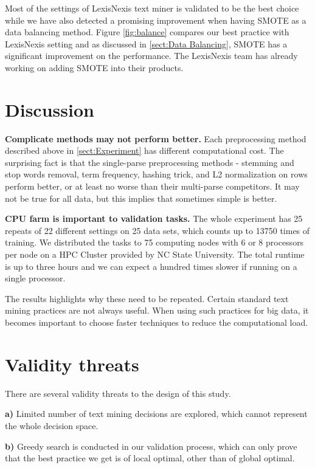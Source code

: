 \documentclass{sig-alternate-05-2015}
\newcommand{\tion}[1]{\textsection\ref{sect:#1}}
\begin{document}
Most of the settings of LexisNexis text miner is validated to be the best choice while we have also detected a promising improvement when having SMOTE as a data balancing method. Figure \ref{fig:balance} compares our best practice with LexisNexis setting and as discussed in \tion{Data Balancing}, SMOTE has a significant improvement on the performance. The LexisNexis team has already working on adding SMOTE into their products. 


\section{Discussion}
\label{sect:Discussion}


\textbf{Complicate methods may not perform better. }Each preprocessing method described above in \tion{Experiment} has different computational cost. The surprising fact is that the single-parse preprocessing methods - stemming and stop words removal, term frequency, hashing trick, and L2 normalization on rows perform better, or at least no worse than their multi-parse competitors. It may not be true for all data, but this implies that sometimes simple is better.

\textbf{CPU farm is important to validation tasks.} The whole experiment has 25 repeats of 22 different settings on 25 data sets, which counts up to 13750 times of training. We distributed the tasks to 75 computing nodes with 6 or 8 processors per node on a HPC Cluster provided by NC State University. The total runtime is up to three hours and we can expect a hundred times slower if running on a single processor.

The results highlights why these need to be repeated. Certain standard text mining practices are not always useful. When using such practices for big data, it becomes important to choose faster techniques to reduce the computational load. 

\section{Validity threats}

There are several validity threats to the design of this study. 

\textbf{a)} Limited number of text mining decisions are explored, which cannot represent the whole decision space. 

\textbf{b)} Greedy search is conducted in our validation process, which can only prove that the best practice we get is of local optimal, other than of global optimal. 
\end{document}
